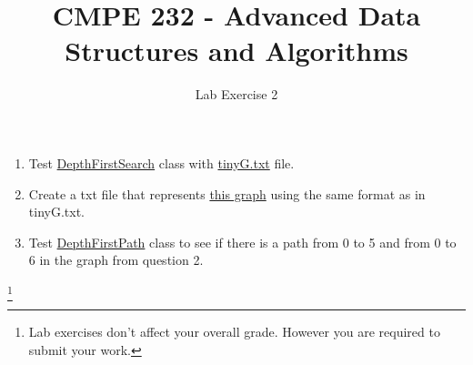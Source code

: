\documentclass{article}
\newcommand\blfootnote[1]{%
  \begingroup
  \renewcommand\thefootnote{}\footnote{#1}%
  \addtocounter{footnote}{-1}%
  \endgroup
}
\begin{document}
\author{Lab Exercise 2}
\title{CMPE 232 - Advanced Data Structures and Algorithms}




\date{}
\maketitle
\setcounter{secnumdepth}{0}
\begin{enumerate}
\item Test \href{https://github.com/uzay00/CMPE232/blob/master/Lecture2/DepthFirstSearch.java}{DepthFirstSearch} class with \href{https://github.com/uzay00/CMPE232/blob/master/Lecture2/tinyG.txt}{tinyG.txt} file.
\item Create a txt file that represents \href{https://github.com/uzay00/CMPE232/blob/master/Lab2/DFS.png}{this graph} using the same format as in tinyG.txt.
\item Test \href{https://github.com/uzay00/CMPE232/blob/master/Lecture2/DepthFirstPaths.java}{DepthFirstPath} class to see if there is a path from 0 to 5 and from 0 to 6 in the graph from question 2. 
\end{enumerate}


\blfootnote{Lab exercises don't affect your overall grade. However you are required to submit your work.}
\end{document}
